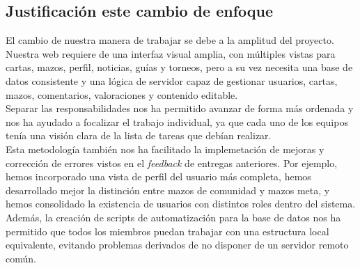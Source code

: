 \documentclass[10pt]{article}
\begin{document}
	\subsection{Justificación este cambio de enfoque}
	El cambio de nuestra manera de trabajar se debe a la amplitud del proyecto. Nuestra web requiere de una interfaz visual amplia, con múltiples vistas para cartas, mazos, perfil, noticias, guías y torneos, pero a su vez necesita una base de datos consistente y una lógica de servidor capaz de gestionar usuarios, cartas, mazos, comentarios, valoraciones y contenido editable.\\
	
	Separar las responsabilidades nos ha permitido avanzar de forma más ordenada y nos ha ayudado a focalizar el trabajo individual, ya que cada uno de los equipos tenía una visión clara de la lista de tareas que debían realizar.\\
	
	Esta metodología también nos ha facilitado la implemetación de mejoras y corrección de errores vistos en el \textit{feedback} de entregas anteriores. Por ejemplo, hemos incorporado una vista de perfil del usuario más completa, hemos desarrollado mejor la distinción entre mazos de comunidad y mazos meta, y hemos consolidado la existencia de usuarios con distintos roles dentro del sistema. Además, la creación de scripts de automatización para la base de datos nos ha permitido que todos los miembros puedan trabajar con una estructura local equivalente, evitando problemas derivados de no disponer de un servidor remoto común.
	
	
	
	
	\newpage
\end{document}
